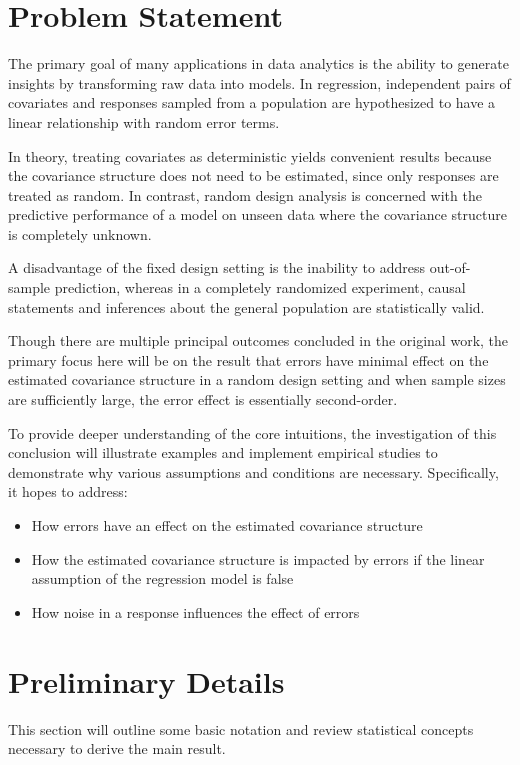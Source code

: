 \documentclass[nohyperref]{article}
\theoremstyle{plain}
\theoremstyle{definition}
\theoremstyle{remark}
\begin{document}
\section{Problem Statement}

The primary goal of many applications in data analytics is the ability to generate insights by transforming raw data into models. In regression, independent pairs of covariates and responses sampled from a population are hypothesized to have a linear relationship with random error terms. 

In theory, treating covariates as deterministic yields convenient results because the covariance structure does not need to be estimated, since only responses are treated as random. In contrast, random design analysis is concerned with the predictive performance of a model on unseen data where the covariance structure is completely unknown. 

A disadvantage of the fixed design setting is the inability to address out-of-sample prediction, whereas in a completely randomized experiment, causal statements and inferences about the general population are statistically valid. 

Though there are multiple principal outcomes concluded in the original work, the primary focus here will be on the result that errors have minimal effect on the estimated covariance structure in a random design setting and when sample sizes are sufficiently large, the error effect is essentially second-order.

To provide deeper understanding of the core intuitions, the investigation of this conclusion will illustrate examples and implement empirical studies to demonstrate why various assumptions and conditions are necessary. Specifically, it hopes to address:

\pagebreak

\begin{itemize}
\item How errors have an effect on the estimated covariance structure
\item How the estimated covariance structure is impacted by errors if the linear assumption of the regression model is false
\item How noise in a response influences the effect of errors
\end{itemize}







\section{Preliminary Details}
This section will outline some basic notation and review statistical concepts necessary to derive the main result.
\end{document}
